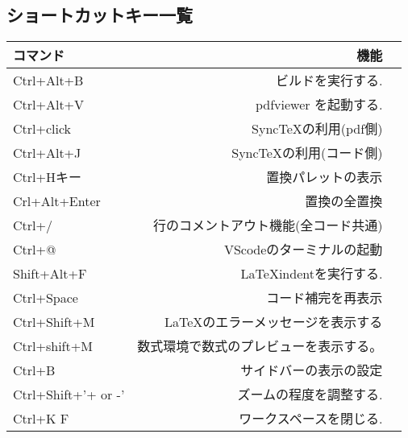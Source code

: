 \documentclass{ltjsarticle}
\begin{document}
\subsection*{ショートカットキー一覧}
\begin{center}
  \begin{tabular}{lrr} \hline
    コマンド            & 機能                  \\ \hline
    Ctrl+Alt+B          & ビルドを実行する.           \\
    Ctrl+Alt+V          & pdfviewer を起動する.    \\
    Ctrl+click          & SyncTeXの利用(pdf側)    \\
    Ctrl+Alt+J          & SyncTeXの利用(コード側)    \\
    Ctrl+Hキー            & 置換パレットの表示           \\
    Crl+Alt+Enter       & 置換の全置換              \\
    Ctrl+/              & 行のコメントアウト機能(全コード共通) \\
    Ctrl+@              & VScodeのターミナルの起動     \\
    Shift+Alt+F         & LaTeXindentを実行する.\\
    Ctrl+Space          & コード補完を再表示\\
    Ctrl+Shift+M        & \LaTeX のエラーメッセージを表示する\\
    Ctrl+shift+M & 数式環境で数式のプレビューを表示する。\\ 
    Ctrl+B              & サイドバーの表示の設定\\
    Ctrl+Shift+'+ or -' & ズームの程度を調整する.        \\
    Ctrl+K F            & ワークスペースを閉じる.\\ \hline
  \end{tabular}
\end{center}
\end{document}
